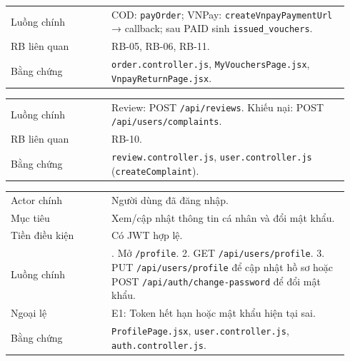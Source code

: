 \begin{longtable}{>{\raggedright\arraybackslash}p{0.28\linewidth}>{\raggedright\arraybackslash}p{0.66\linewidth}}
Luồng chính & COD: \texttt{payOrder}; VNPay: \texttt{createVnpayPaymentUrl} → callback; sau PAID sinh \texttt{issued\_vouchers}.\\
RB liên quan & RB-05, RB-06, RB-11.\\
Bằng chứng & \texttt{order.controller.js}, \texttt{MyVouchersPage.jsx}, \texttt{VnpayReturnPage.jsx}.\\
\end{longtable}

\begin{longtable}{>{\raggedright\arraybackslash}p{0.28\linewidth}>{\raggedright\arraybackslash}p{0.66\linewidth}}
Luồng chính & Review: POST \texttt{/api/reviews}. Khiếu nại: POST \texttt{/api/users/complaints}.\\
RB liên quan & RB-10.\\
Bằng chứng & \texttt{review.controller.js}, \texttt{user.controller.js} (\texttt{createComplaint}).\\
\end{longtable}

\begin{longtable}{>{\raggedright\arraybackslash}p{0.28\linewidth}>{\raggedright\arraybackslash}p{0.66\linewidth}}
Actor chính & Người dùng đã đăng nhập.\\
Mục tiêu & Xem/cập nhật thông tin cá nhân và đổi mật khẩu.\\
Tiền điều kiện & Có JWT hợp lệ.\\
Luồng chính & 1. Mở \texttt{/profile}. 2. GET \texttt{/api/users/profile}. 3. PUT \texttt{/api/users/profile} để cập nhật hồ sơ hoặc POST \texttt{/api/auth/change-password} để đổi mật khẩu.\\
Ngoại lệ & E1: Token hết hạn hoặc mật khẩu hiện tại sai.\\
Bằng chứng & \texttt{ProfilePage.jsx}, \texttt{user.controller.js}, \texttt{auth.controller.js}.\\
\end{longtable}

